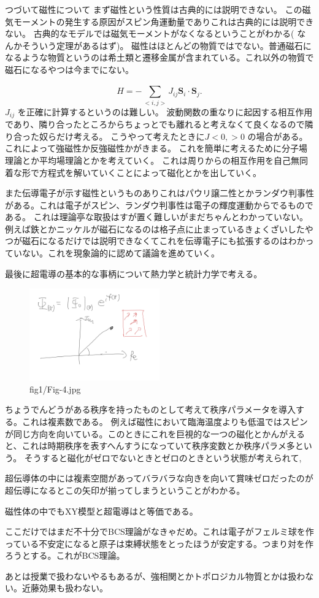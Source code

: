 \documentclass[dvipdfmx]{jsarticle}
\begin{document}
つづいて磁性について
まず磁性という性質は古典的には説明できない。
この磁気モーメントの発生する原因がスピン角運動量でありこれは古典的には説明できない。
古典的なモデルでは磁気モーメントがなくなるということがわかる( なんかそういう定理があるはず)。
磁性はほとんどの物質ではでない。普通磁石になるような物質というのは希土類と遷移金属が含まれている。これ以外の物質で磁石になるやつは今までにない。

\[
H=-\sum_{<i,j>}^{}J_{ij} \bm{S}_i\cdot \bm{S}_j
.\] 
$J_{ij}$ を正確に計算するというのは難しい。
波動関数の重なりに起因する相互作用であり、隣り合ったところからちょっとでも離れると考えなくて良くなるので隣り合った奴らだけ考える。
こうやって考えたときに$J<0,>0$ の場合がある。
これによって強磁性か反強磁性かがきまる。
これを簡単に考えるために分子場理論とか平均場理論とかを考えていく。
これは周りからの相互作用を自己無同着な形で方程式を解いていくことによって磁化とかを出していく。

また伝導電子が示す磁性というものありこれはパウリ譲二性とかランダウ判事性がある。これは電子がスピン、ランダウ判事性は電子の輝度運動からでるものである。
これは理論亭な取扱はすが置く難しいがまだちゃんとわかっていない。
例えば鉄とかニッケルが磁石になるのは格子点に止まっているきょくざいしたやつが磁石になるだけでは説明できなくてこれを伝導電子にも拡張するのはわかっていない。これを現象論的に認めて議論を進めていく。


最後に超電導の基本的な事柄について熱力学と統計力学で考える。
\begin{figure}[H]
	\centering
	\includegraphics[width=0.5\textwidth]{fig1/Fig-4.jpg}
	\caption{fig1/Fig-4.jpg}
	\label{fig:fig1-Fig-4-jpg}
\end{figure}
ちょうでんどうがある秩序を持ったものとして考えて秩序パラメータを導入する。これは複素数である。
例えば磁性において臨海温度よりも低温ではスピンが同じ方向を向いている。このときにこれを巨視的な一つの磁化とかんがえると、これは時期秩序を表すへんすうになっていて秩序変数とか秩序パラメ多という。
そうすると磁化がゼロでないときとゼロのときという状態が考えられて,

超伝導体の中には複素空間があってバラバラな向きを向いて賞味ゼロだったのが超伝導になるとこの矢印が揃ってしまうということがわかる。

磁性体の中でもXY模型と超電導はと等価である。

ここだけではまだ不十分でBCS理論がなきゃだめ。これは電子がフェルミ球を作っている不安定になると原子は束縛状態をとったほうが安定する。つまり対を作ろうとする。これがBCS理論。

あとは授業で扱わないやるもあるが、強相関とかトポロジカル物質とかは扱わない。近藤効果も扱わない。
\end{document}
